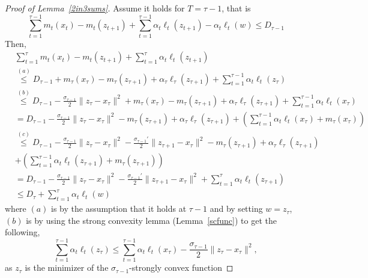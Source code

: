 \documentclass[pmlr]{jmlr} %
\begin{document}
\begin{proof}[Proof of Lemma~\ref{2in3sums}]
Assume it holds for $T = \tau-1$, that is
\begin{equation}
 \sum_{t=1}^{\tau-1} m_{t}(x_{t}) - m_{t}(z_{t+1}) + \sum_{t=1}^{\tau-1} \alpha_{t} \ell_{t}(z_{t+1}) - \alpha_{t} \ell_{t}(w)
 \leq D_{\tau-1}
\end{equation}
Then,
\begin{equation}
\begin{aligned}
& \sum_{t=1}^{\tau} m_{t}(x_{t}) - m_{t}(z_{t+1}) + \sum_{t=1}^{\tau} \alpha_{t} \ell_{t}(z_{t+1}) 
\\ & \overset{(a)}{\leq} D_{\tau-1} + m_{\tau}(x_{\tau}) - m_{\tau}(z_{\tau+1})  + \alpha_{\tau} \ell_{\tau}(z_{\tau+1}) + \sum_{t=1}^{\tau-1}\alpha_{t} \ell_{t} (z_{\tau}) 
\\ & \overset{(b)}{\leq} D_{\tau-1} - \frac{\sigma_{\tau-1}}{2} \| z_{\tau} - x_{\tau}\|^{2} + m_{\tau}(x_{\tau}) - m_{\tau}(z_{\tau+1})  + \alpha_{\tau} \ell_{\tau}(z_{\tau+1}) + \sum_{t=1}^{\tau-1}\alpha_{t} \ell_{t} (x_{\tau}) 
\\ & = D_{\tau-1} - \frac{\sigma_{\tau-1}}{2} \| z_{\tau} - x_{\tau}\|^{2}  - m_{\tau}(z_{\tau+1})  + \alpha_{\tau} \ell_{\tau}(z_{\tau+1}) + ( \sum_{t=1}^{\tau-1}\alpha_{t} \ell_{t} (x_{\tau}) + m_{\tau}(x_{\tau}) )
\\ & \overset{(c)}{\leq} D_{\tau-1} - \frac{\sigma_{\tau-1}}{2} \| z_{\tau} - x_{\tau}\|^{2} 
- \frac{\sigma_{\tau-1}'}{2} \| z_{\tau+1} - x_{\tau}\|^{2} 
 - m_{\tau}(z_{\tau+1})  + \alpha_{\tau} \ell_{\tau}(z_{\tau+1}) \\& + ( \sum_{t=1}^{\tau-1}\alpha_{t} \ell_{t} (z_{\tau+1}) + m_{\tau}(z_{\tau+1} ))
\\ &  = D_{\tau-1} - \frac{\sigma_{\tau-1}}{2} \| z_{\tau} - x_{\tau}\|^{2} 
- \frac{\sigma_{\tau-1}'}{2} \| z_{\tau+1} - x_{\tau}\|^{2} 
  + \sum_{t=1}^{\tau}\alpha_{t} \ell_{t} (z_{\tau+1}) 
\\ & \leq D_{\tau} + \sum_{t=1}^{\tau}\alpha_{t} \ell_{t} (w)
\end{aligned}
\end{equation}
where $(a)$ is by the assumption that it holds at $\tau-1$ and by setting $w=z_{\tau}$,
$(b)$ is by using the strong convexity lemma (Lemma~\ref{scfunc}) to get the following,
\begin{equation}
 \sum_{t=1}^{\tau-1}\alpha_{t} \ell_{t} (z_{\tau}) \leq  \sum_{t=1}^{\tau-1}\alpha_{t} \ell_{t} (x_{\tau}) - \frac{\sigma_{\tau-1}}{2} \| z_{\tau} - x_{\tau}\|^{2},
\end{equation}
as $z_{\tau}$ is the minimizer of the $\sigma_{\tau-1}$-strongly convex function

\end{proof}
\end{document}
